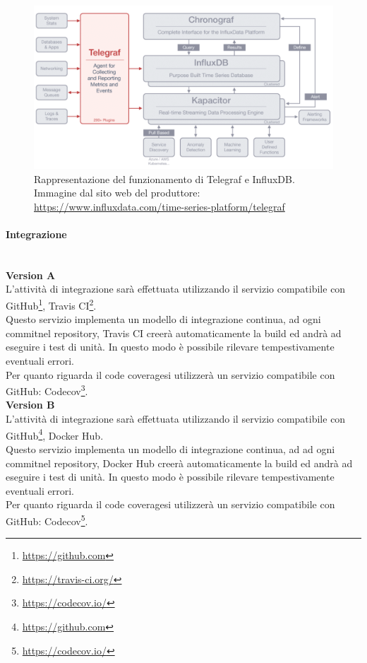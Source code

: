 \begin{figure}[H]
	\begin{center}
		\includegraphics[scale=0.4]{./images/influxTelegraf.jpg}
		\caption{Rappresentazione del funzionamento di Telegraf e InfluxDB. Immagine dal sito web del produttore: \url{https://www.influxdata.com/time-series-platform/telegraf}}
	\end{center}
\end{figure}

\paragraph{Integrazione}\label{Progettazione_Integrazione}\-\\
\textbf{Version A}\\
L'attività di integrazione sarà effettuata utilizzando il servizio compatibile con GitHub\glossario\footnote{\url{https://github.com}}, Travis CI\glossario\footnote{\url{https://travis-ci.org/}}.\\
Questo servizio implementa un modello di integrazione continua, ad ogni commit\glossario nel repository\glossario, Travis CI creerà automaticamente la build ed andrà ad eseguire i test di unità. In questo modo è possibile rilevare tempestivamente eventuali errori.\\
Per quanto riguarda il code coverage\glossario si utilizzerà un servizio compatibile con GitHub: Codecov\glossario\footnote{\url{https://codecov.io/}}.\\

\textbf{Version B}\\
L'attività di integrazione sarà effettuata utilizzando il servizio compatibile con GitHub\glossario\footnote{\url{https://github.com}}, Docker Hub\glossario.\\ Questo servizio implementa un modello di integrazione continua, ad ad ogni commit\glossario nel repository\glossario, Docker Hub creerà automaticamente la build ed andrà ad eseguire i test di unità. In questo modo è possibile rilevare tempestivamente eventuali errori.\\
Per quanto riguarda il code coverage\glossario si utilizzerà un servizio compatibile con GitHub: Codecov\glossario\footnote{\url{https://codecov.io/}}.

